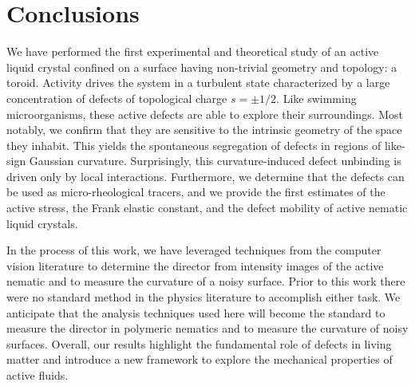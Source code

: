 \section{Conclusions}
We have performed the first experimental and theoretical study of an active liquid crystal confined on a surface having non-trivial geometry and topology: a toroid.
Activity drives the system in a turbulent state characterized by a large concentration of defects of topological charge $s = \pm 1/2$.
Like swimming microorganisms, these active defects are able to explore their surroundings.
Most notably, we confirm that they are sensitive to the intrinsic geometry of the space they inhabit.
This yields the spontaneous segregation of defects in regions of like-sign Gaussian curvature.
Surprisingly, this curvature-induced defect unbinding is driven only by local interactions.
Furthermore, we determine that the defects can be used as micro-rheological tracers, and we provide the first estimates of the active stress, the Frank elastic constant, and the defect mobility of active nematic liquid crystals.

In the process of this work, we have leveraged techniques from the computer vision literature to determine the director from intensity images of the active nematic and to measure the curvature of a noisy surface.
Prior to this work there were no standard method in the physics literature to accomplish either task.
We anticipate that the analysis techniques used here will become the standard to measure the director in polymeric nematics and to measure the curvature of noisy surfaces.
Overall, our results highlight the fundamental role of defects in living matter and introduce a new framework to explore the mechanical properties of active fluids.
